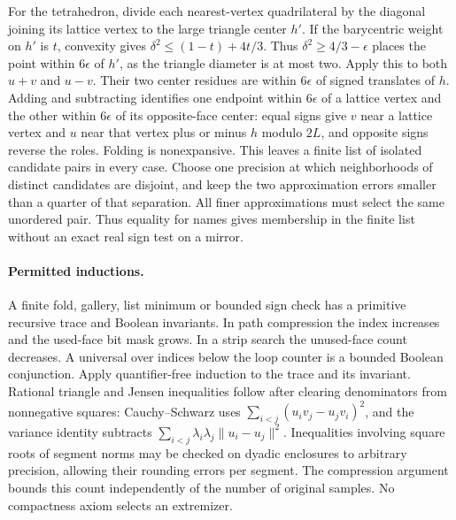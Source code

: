 For the tetrahedron, divide each nearest-vertex quadrilateral by the diagonal joining its lattice vertex to the large triangle center $h'$. If the barycentric weight on $h'$ is $t$, convexity gives $\delta^2\le (1-t)+4t/3$. Thus $\delta^2\ge4/3-\epsilon$ places the point within $6\epsilon$ of $h'$, as the triangle diameter is at most two. Apply this to both $u+v$ and $u-v$. Their two center residues are within $6\epsilon$ of signed translates of $h$. Adding and subtracting identifies one endpoint within $6\epsilon$ of a lattice vertex and the other within $6\epsilon$ of its opposite-face center: equal signs give $v$ near a lattice vertex and $u$ near that vertex plus or minus $h$ modulo $2L$, and opposite signs reverse the roles. Folding is nonexpansive. This leaves a finite list of isolated candidate pairs in every case. Choose one precision at which neighborhoods of distinct candidates are disjoint, and keep the two approximation errors smaller than a quarter of that separation. All finer approximations must select the same unordered pair. Thus equality for names gives membership in the finite list without an exact real sign test on a mirror.

\paragraph{Permitted inductions.}
A finite fold, gallery, list minimum or bounded sign check has a primitive recursive trace and Boolean invariants. In path compression the index increases and the used-face bit mask grows. In a strip search the unused-face count decreases. A universal over indices below the loop counter is a bounded Boolean conjunction. Apply quantifier-free induction to the trace and its invariant. Rational triangle and Jensen inequalities follow after clearing denominators from nonnegative squares: Cauchy--Schwarz uses $\sum_{i<j}(u_i v_j-u_j v_i)^2$, and the variance identity subtracts $\sum_{i<j}\lambda_i\lambda_j\|u_i-u_j\|^2$. Inequalities involving square roots of segment norms may be checked on dyadic enclosures to arbitrary precision, allowing their rounding errors per segment. The compression argument bounds this count independently of the number of original samples. No compactness axiom selects an extremizer.

